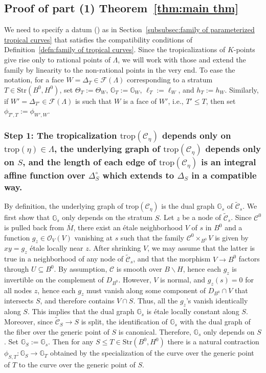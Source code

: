 \documentclass[11pt,reqno]{amsart}
\numberwithin{equation}{section}
\theoremstyle{definition}
\newcommand{\trop}{\mathrm{trop}}
\newcommand{\GG}{{\mathbb G}}
\newcommand{\CF}{{\mathcal F}}
\newcommand{\cC}{{\mathcal{C}}}
\theoremstyle{remark}
\begin{document}
\subsection{Proof of part (1) Theorem~\ref{thm:main thm}}
We need to specify a datum (\dag) as in Section~\ref{subsubsec:family of parameterized tropical curves} that satisfies the compatibility conditions of Definition~\ref{defn:family of tropical curves}. Since the tropicalizations of $K$-points give rise only to rational points of $\Lambda$, we will work with those and extend the family by linearity to the non-rational points in the very end. To ease the notation, for a face $W=\Delta_T\in \CF(\Lambda)$ corresponding to a stratum $T \in \mathrm{Str}(B^0, H^0)$, set $\Theta_T:=\Theta_W$, $\GG_T:=\GG_W$, $\ell_T:=\ell_W$, and $h_T:=h_W$. Similarly, if $W'=\Delta_{T'}\in \CF(\Lambda)$ is such that $W$ is a face of $W'$, i.e., $T'\le T$, then set $\phi_{T',T}:=\phi_{W',W}$.

\subsubsection*{Step 1: The tropicalization $\trop(\cC_\eta)$ depends only on $\trop(\eta)\in \Lambda$, the underlying graph of $\trop(\cC_\eta)$ depends only on $S$, and the length of each edge of $\trop(\cC_\eta)$ is an integral affine function over $\Delta_S^\circ$ which extends to $\Delta_S$ in a compatible way.}
  
By definition, the underlying graph of $\trop(\cC_\eta)$ is the dual graph $\mathbb G_s$ of $\widetilde\cC_s$. 
We first show that $\mathbb G_s$ only depends on the stratum $S$. Let $z$ be a node of $\widetilde \cC_s$. Since $\cC^0$ is pulled back from $\overline M$, there exist an \'etale neighborhood $V$ of $s$ in $B^0$ and a function $g_z\in \mathcal O_V(V)$ vanishing at $s$ such that the family $\cC^0\times_{B^0}V$ is given by $xy=g_z$ \'etale locally near $z$. After shrinking $V$, we may assume that the latter is true in a neighborhood of any node of $\widetilde\cC_s$, and that the morphism $V\to B^0$ factors through $U\subseteq B^0$. By assumption, $\cC$ is smooth over $B\backslash H$, hence each $g_z$ is invertible on the complement of $D_{B^0}$. However, $V$ is normal, and $g_z(s)=0$ for all nodes $z$, hence each $g_z$ must vanish along some component of $D_{B^0}\cap V$ that intersects $S$, and therefore contains $V\cap S$. Thus, all the $g_z$'s vanish identically along $S$. This implies that the dual graph $\mathbb G_s$ is \'etale locally constant along $S$. Moreover, since $\widetilde \cC_S\rightarrow S$ is split, the identification of $\mathbb G_s$ with the dual graph of the fiber over the generic point of $S$ is canonical. Therefore, $\mathbb G_s$ only depends on $S$. Set $\GG_S:=\GG_s$. Then for any $S\le T\in \mathrm{Str}(B^0,H^0)$ there is a natural contraction $\phi_{S,T}\colon \GG_{S}\rightarrow \GG_{T}$ obtained by the specialization of the curve over the generic point of $T$ to the curve over the generic point of $S$.
\end{document}
